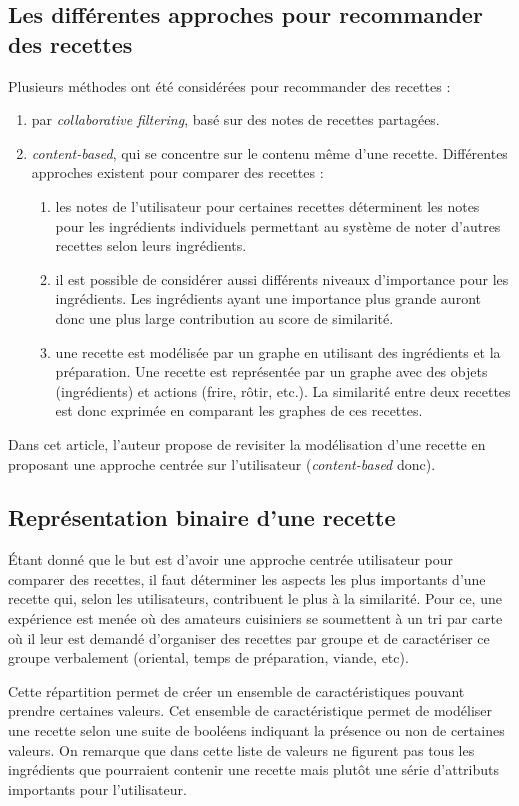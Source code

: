 \documentclass[a4paper, 11pt]{article}
\begin{document}
\subsection{Les différentes approches pour recommander des recettes}
Plusieurs méthodes ont été considérées pour recommander des recettes :
\begin{enumerate}
	\item par \textit{collaborative filtering}, basé sur des notes de recettes partagées.
	\item \textit{content-based}, qui se concentre sur le contenu même d'une recette. Différentes approches existent pour comparer des recettes :
	\begin{enumerate}
		\item	les notes de l'utilisateur pour certaines  recettes déterminent les notes pour les ingrédients individuels permettant au système de noter d'autres recettes selon leurs ingrédients. 
		\item il est possible de considérer aussi différents niveaux d'importance pour les ingrédients. Les ingrédients ayant une importance plus grande auront donc une plus large contribution au score de similarité.
		\item une recette est modélisée par un graphe en utilisant des ingrédients et la préparation. Une recette est représentée par un graphe avec des objets (ingrédients) et actions (frire, rôtir, etc.). La similarité entre deux recettes est donc exprimée en comparant les graphes de ces recettes.
	\end{enumerate}
\end{enumerate}
Dans cet article, l'auteur propose de revisiter la modélisation d'une recette en proposant une approche centrée sur l'utilisateur (\textit{content-based} donc). 
\subsection{Représentation binaire d'une recette}
Étant donné que le but est d'avoir une approche centrée utilisateur pour comparer des recettes, il faut déterminer les aspects les plus importants d'une recette qui, selon les utilisateurs, contribuent le plus à la similarité. Pour ce, une expérience est menée où des amateurs cuisiniers se soumettent à un tri par carte où il leur est demandé d'organiser des recettes par groupe et de caractériser ce groupe verbalement (oriental, temps de préparation, viande, etc). 
\\ \par 
Cette répartition permet de créer un ensemble de caractéristiques pouvant prendre certaines valeurs. Cet ensemble de caractéristique permet de modéliser une recette selon une suite de booléens indiquant la présence ou non de certaines valeurs. On remarque que dans cette liste de valeurs ne figurent pas tous les ingrédients que pourraient contenir une recette mais plutôt une série d'attributs importants pour l'utilisateur.
\end{document}
